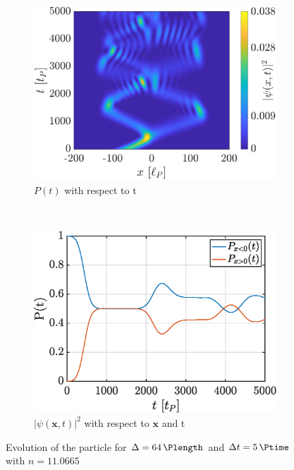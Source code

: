 \documentclass[a4paper,12pt,twoside]{article}
\newcommand{\mbf}[1]{\mathbf{#1}} %
\begin{document}
      \begin{figure}[h]
        \centering
        \begin{subfigure}[t]{0.45\textwidth}
          \includegraphics[width=\textwidth]{graphs/iii_findn_cont_evo.eps}
          \caption{$P(t)$ with respect to t}
          \label{fig:iii_findn_cont_evo}
        \end{subfigure}
        ~
        \begin{subfigure}[t]{0.45\textwidth}
          \includegraphics[width=\textwidth]{graphs/iii_findn_cont_prob.eps}
          \caption{$|\psi(\mbf{x}, t)|^2$ with respect to $\mbf{x}$ and t}
          \label{fig:iii_findn_cont_prob}
        \end{subfigure}
        \caption{Evolution of the particle for $\Delta = \SI{64}{\Plength}$ and $\Delta t = \SI{5}{\Ptime}$ with $n=\num{11.0665}$}
        \label{fig:iii_findn_cont}
      \end{figure}
\end{document}
